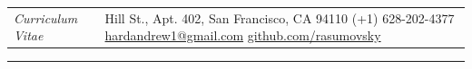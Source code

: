 \documentclass{letter}
\begin{document}
 

\begin{tabular}{p{}p{}}
	\hfill \newline \href{https://ch.linkedin.com/in/andrew-hard-25b690a5}{\Huge{\color{Maroon}{Andrew Hard}}} \newline \LARGE{\textit{Curriculum Vitae}} \newline
	&
	\hfill \newline 1 Hill St., Apt. 402, San Francisco, CA 94110 \newline
	(+1) 628-202-4377 \newline
	\href{mailto:hardandrew1@gmail.com}{hardandrew1@gmail.com} \newline
	\href{https://github.com/rasumovsky}{github.com/rasumovsky}\\
\end{tabular}

\begin{flushleft}
\Large{\textsc{\textbf{\color{Maroon}{Experience}}}}
\vspace{1pt} %
\hrule
\end{flushleft}
\end{document}
